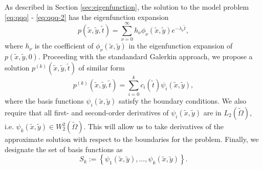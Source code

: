 As described in Section \ref{sec:eigenfunction}, the solution to the
model problem \eqref{eq:qqq} - \eqref{eq:qqq-2} has the eigenfunction
expansion
\[
  p(\tilde{x},\tilde{y},\tilde{t}) = \sum_{\nu=0}^\infty h_\nu
  \phi_\nu(\tilde{x},\tilde{y}) e^{-\lambda_\nu \tilde{t}},
\]
where $h_\nu$ is the coefficient of $\phi_\nu(\tilde{x},\tilde{y})$ in the
eigenfunction expansion of $p(\tilde{x},\tilde{y},0)$. Proceeding with the standandard
Galerkin approach, we propose a solution $p^{(k)}(\tilde{x},\tilde{y},\tilde{t})$ of similar
form
\[
  p^{(k)}(\tilde{x},\tilde{y},\tilde{t}) = \sum_{i=0}^k c_i(\tilde{t})
  \psi_i(\tilde{x},\tilde{y}),
\]
where the basis functions $\psi_i(\tilde{x},\tilde{y})$ satisfy the
boundary conditions. We also require that all first- and second-order
derivatives of $\psi_i(\tilde{x},\tilde{y})$ are in
$L_2(\tilde{\Omega})$, i.e.
$\psi_k(\tilde{x},\tilde{y}) \in W_{2}^{2}(\tilde{\Omega})$. This will
allow us to take derivatives of the approximate solution with respect
to the boundaries for the problem. Finally, we designate the set of
basis functions as
\[
  S_k := \left\{ \psi_1(\tilde{x},\tilde{y}), \ldots, \psi_k(\tilde{x},\tilde{y}) \right\}.
\]

